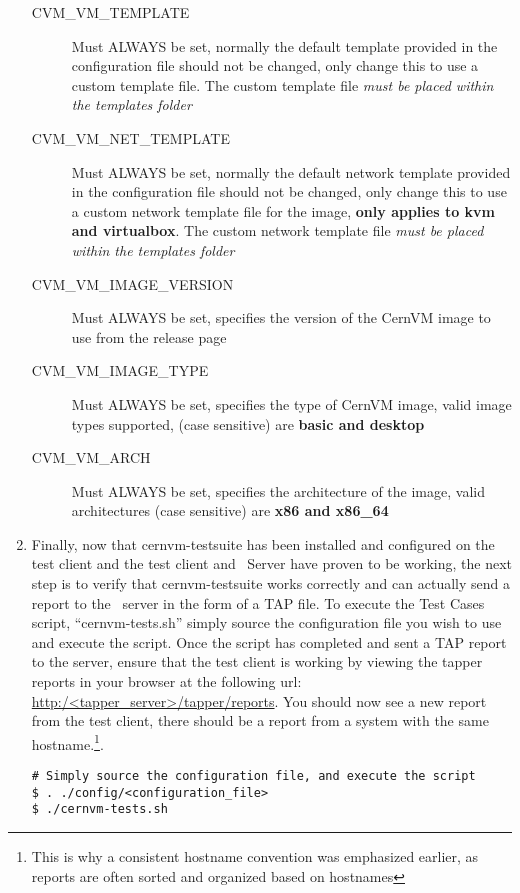 \begin{enumerate}
\begin{description}
\item[CVM\_VM\_TEMPLATE]		Must ALWAYS be set, normally the default template provided in the configuration file should not be changed,
								only change this to use a custom template file. The custom template file \emph{must be placed within the
								templates folder}

\item[CVM\_VM\_NET\_TEMPLATE]	Must ALWAYS be set, normally the default network template provided in the configuration file should not be
	 							changed, only change this to use a custom network template file for the \cernvm image,  {\bf only applies to kvm
	 							and virtualbox}. The custom network template file \emph{must be placed within the templates folder}

\item[CVM\_VM\_IMAGE\_VERSION]	Must ALWAYS be set, specifies the version of the CernVM image to use from the release page
	
\item[CVM\_VM\_IMAGE\_TYPE]		Must ALWAYS be set,  specifies the type of CernVM image, valid image types supported, (case sensitive) are 
								{\bf basic and desktop}

\item[CVM\_VM\_ARCH]		Must ALWAYS be set, specifies the architecture of the \cernvm image, valid architectures (case sensitive) are {\bf 
							x86 and x86\_64}
\end{description}	

\item	Finally, now that cernvm-testsuite has been installed and configured on the test client and the test client and \tapper~Server
			have proven to be working, the next step is to verify that cernvm-testsuite works correctly and can actually send a report to 	
			the \tapper~server in the form of a TAP file. To execute the \cernvm Test Cases script, ``cernvm-tests.sh'' simply source
			the configuration file you wish to use and execute the script. Once the script has completed and sent a TAP report to the server, 
			ensure that the test client is working by viewing the tapper reports in your browser at the  following 
			url: \url{http:/<tapper\_server>/tapper/reports}. You should now see a new report from the test client, there should be a 
			report from a system with the same hostname.\footnote{This is why a consistent hostname convention was emphasized earlier, as 
			reports are often sorted and organized based on hostnames}.

\lstset{language=bash,caption=Execute CernVM Test Cases Script}
\begin{lstlisting}
# Simply source the configuration file, and execute the script
$ . ./config/<configuration_file>
$ ./cernvm-tests.sh
\end{lstlisting}
\end{enumerate}